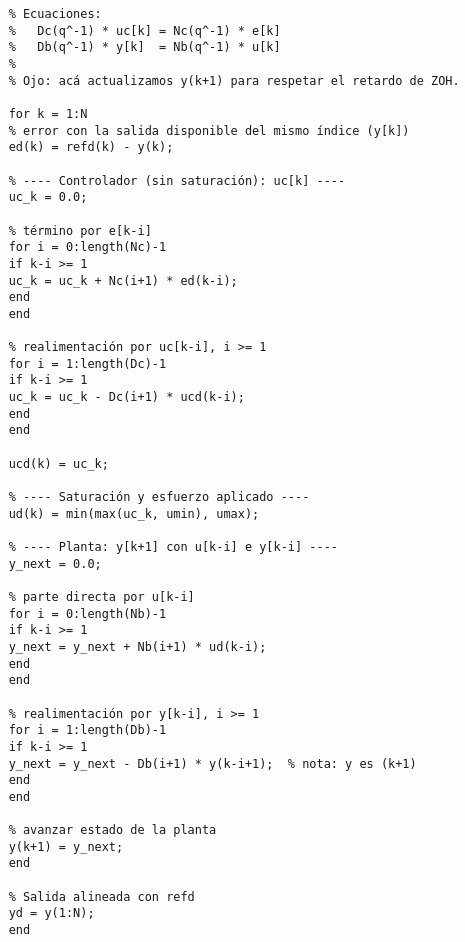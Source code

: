 \begin{lstlisting}[style=matlabstyle,caption={Simulación de lazo discreto con saturación.}]
	% ===== Bucle causal =====
	% Ecuaciones:
	%   Dc(q^-1) * uc[k] = Nc(q^-1) * e[k]
	%   Db(q^-1) * y[k]  = Nb(q^-1) * u[k]
	%
	% Ojo: acá actualizamos y(k+1) para respetar el retardo de ZOH.
	
	for k = 1:N
	% error con la salida disponible del mismo índice (y[k])
	ed(k) = refd(k) - y(k);
	
	% ---- Controlador (sin saturación): uc[k] ----
	uc_k = 0.0;
	
	% término por e[k-i]
	for i = 0:length(Nc)-1
	if k-i >= 1
	uc_k = uc_k + Nc(i+1) * ed(k-i);
	end
	end
	
	% realimentación por uc[k-i], i >= 1
	for i = 1:length(Dc)-1
	if k-i >= 1
	uc_k = uc_k - Dc(i+1) * ucd(k-i);
	end
	end
	
	ucd(k) = uc_k;
	
	% ---- Saturación y esfuerzo aplicado ----
	ud(k) = min(max(uc_k, umin), umax);
	
	% ---- Planta: y[k+1] con u[k-i] e y[k-i] ----
	y_next = 0.0;
	
	% parte directa por u[k-i]
	for i = 0:length(Nb)-1
	if k-i >= 1
	y_next = y_next + Nb(i+1) * ud(k-i);
	end
	end
	
	% realimentación por y[k-i], i >= 1
	for i = 1:length(Db)-1
	if k-i >= 1
	y_next = y_next - Db(i+1) * y(k-i+1);  % nota: y es (k+1)
	end
	end
	
	% avanzar estado de la planta
	y(k+1) = y_next;
	end
	
	% Salida alineada con refd
	yd = y(1:N);
	end
\end{lstlisting}


